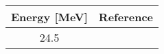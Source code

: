 \begin{tabular}{c c} 
    \toprule
    \bf{Energy [MeV]} & \bf{Reference} \\
    \midrule
    24.5 & \cite{Escudie1974}\\
    \bottomrule
\end{tabular}
